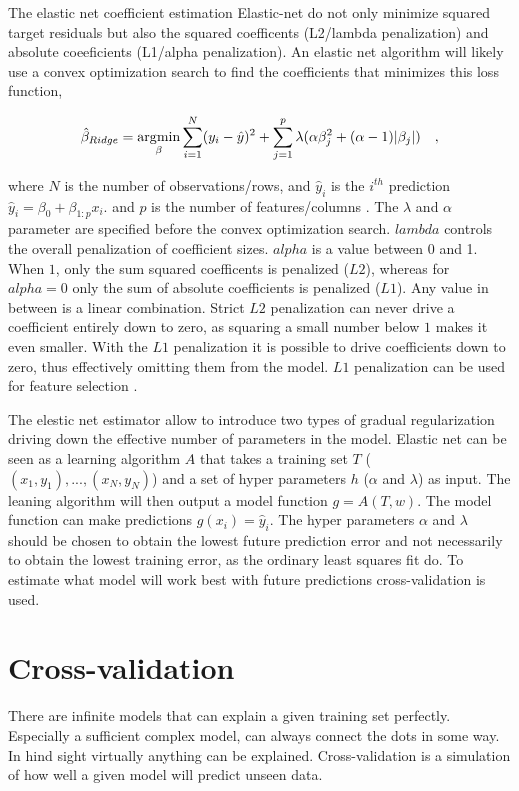 The elastic net coefficient estimation Elastic-net do not only minimize squared target residuals but also the squared coefficents (L2/lambda penalization) and absolute coeeficients (L1/alpha penalization). An elastic net algorithm will likely use a convex optimization search to find the coefficients that minimizes this loss function,

\begin{equation}
\hat{\beta}_{Ridge}  = 	\underset{\beta}{\operatorname*{\arg\!\min}} 
\sum_{i=1}^{N} (y_i - \hat{y})^2 + 
\sum_{j=1}^{p} \lambda(
	 \alpha       \beta_j^2 + 
    (\alpha -1) | \beta_j |
) \quad ,
\end{equation}

where $N$ is the number of observations/rows, and $\hat{y}_i$ is the $i^{th}$ prediction $\hat{y}_i = \beta_0 + \beta_{1:p} x_i.$ and $p$ is the number of features/columns \cite{friedman2001elements}. The $\lambda$ and $\alpha$ parameter are specified before the convex optimization search. $lambda$ controls the overall penalization of coefficient sizes. $alpha$ is a value between 0 and 1. When $1$, only the sum squared coefficents is penalized ($L2$), whereas for $alpha=0$ only the sum of absolute coefficients is penalized ($L1$). Any value in between is a linear combination. Strict $L2$ penalization can never drive a coefficient entirely down to zero, as squaring a small number below $1$ makes it even smaller. With the $L1$ penalization it is possible to drive coefficients down to zero, thus effectively omitting them from the model. $L1$ penalization can be used for feature selection \cite{friedman2001elements}.

The elestic net estimator allow to introduce two types of gradual regularization driving down the effective number of parameters in the model. Elastic net can be seen as a learning algorithm $A$ that takes a training set $T$ ($(x_1,y_1),...,(x_N,y_N)$) and a set of hyper parameters $h$ ($\alpha$ and $\lambda$) as input. The leaning algorithm will then output a model function $g = A(T,w)$. The model function can make predictions $g(x_i)=\hat{y}_i$. The hyper parameters $\alpha$ and $\lambda$ should be chosen to obtain the lowest future prediction error and not necessarily to obtain the lowest training error, as the ordinary least squares fit do. To estimate what model will work best with future predictions cross-validation is used.

\section{Cross-validation}
There are infinite models that can explain a given training set perfectly. Especially a sufficient complex model, can always connect the dots in some way. In hind sight virtually anything can be explained. Cross-validation is a simulation of how well a given model will predict unseen data.

